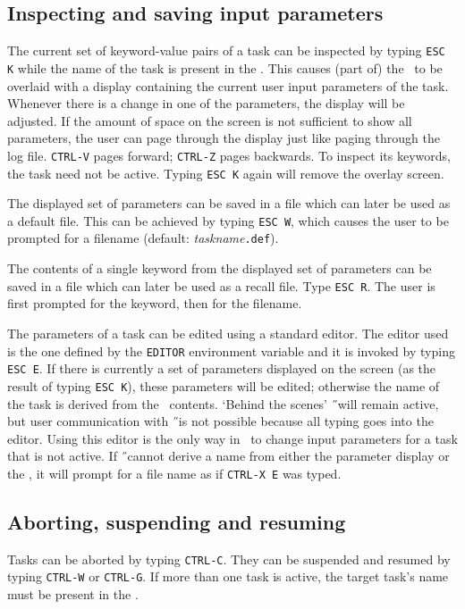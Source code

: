 \subsection*{Inspecting and saving input parameters}
The current set of keyword-value pairs of a task can be inspected by
typing {\tt ESC K}\label{esck} while the name of the task
is present in the \UCA.
This causes (part of) the \COA\ to be overlaid with a display containing the
current user input parameters of the task.
Whenever there is a change in one of the parameters, the display will
be adjusted.
If the amount of space on the screen is not sufficient to show all parameters,
the user can page through the display just like paging through the log file.
{\tt CTRL-V}\label{ctrlvv} pages forward; {\tt CTRL-Z}\label{ctrlzz} pages
backwards.
To inspect its keywords, the task need not be active.
Typing {\tt ESC K} again will remove the overlay screen.

The displayed set of parameters can be saved in a file which can later be used
as a default file. This can be achieved by typing {\tt ESC W},
\label{escw} which causes
the user to be prompted for a filename (default: {\it taskname\/}{\tt .def}).

The contents of a single keyword from the displayed set of parameters
can be saved in a file which can later be
used as a recall file. Type {\tt ESC R}.
\label{escr}The user is first prompted for the
keyword, then for the filename.

The parameters of a task can be edited using a standard editor.
The editor used is the one defined by the {\tt EDITOR} environment variable
and it is invoked by typing {\tt ESC E}.\label{esce}
If there is currently a set of parameters displayed on the screen (as the
result of typing {\tt ESC K}), these parameters will be edited;
otherwise the name of the task is derived from the \UCA\ contents.
`Behind the scenes' \H\ will remain active, but user communication with \H\
is not possible because all typing goes into the editor.
Using this editor is the only way in \tH\ to change input parameters for
a task that is not active.\newline
If \H\ cannot derive a name from either the parameter display or the \UCA,
it will prompt for a file name as if {\tt CTRL-X E} was typed.

\subsection*{Aborting, suspending and resuming}
Tasks can be aborted by typing {\tt CTRL-C}\label{ctrlc}.
They can be suspended and resumed by typing {\tt CTRL-W}\label{ctrlw} or
{\tt CTRL-G}\label{ctrlg}.
If more than one task is active, the target task's name must be present in
the \UCA .

